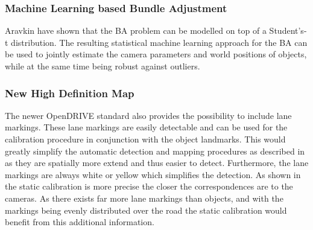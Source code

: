\subsubsection{Machine Learning based Bundle Adjustment}
Aravkin \etal \cite{students_t_bundle_adjustment} have shown that the BA problem can be modelled on top of a Student's-t distribution. 
The resulting statistical machine learning approach for the BA can be used to jointly estimate the camera parameters and world positions of objects, while at the same time being robust against outliers.
  
\subsubsection{New High Definition Map}
The newer OpenDRIVE standard also provides the possibility to include lane markings.
These lane markings are easily detectable and can be used for the calibration procedure in conjunction with the object landmarks.
This would greatly simplify the automatic detection and mapping procedures as described in  as they are spatially more extend and thus easier to detect.
Furthermore, the lane markings are always white or yellow which simplifies the detection.
As shown in  the static calibration is more precise the closer the correspondences are to the cameras. 
As there exists far more lane markings than objects, and with the markings being evenly distributed over the road the static calibration would benefit from this additional information.